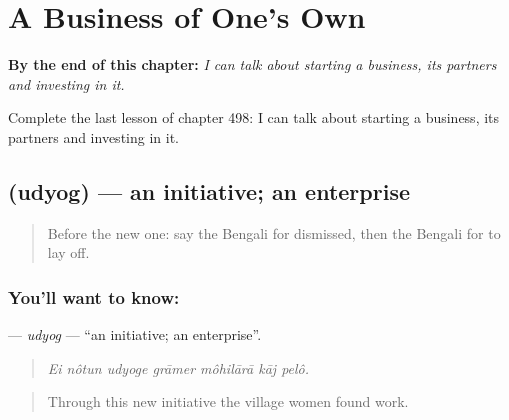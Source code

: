 
\chapter{A Business of One's Own}
\label{ch:bn-a-business-of-one-s-own}

\begin{chapteropening}
\textbf{By the end of this chapter:} \emph{I can talk about starting a business, its partners and investing in it.}

Complete the last lesson of chapter 498: I can talk about starting a business, its partners and investing in it.
\end{chapteropening}

\section[\texorpdfstring{\bn{উদ্যোগ} (udyog)}{উদ্যোগ (udyog)}]{ (udyog) — an initiative; an enterprise}

\label{lesson:BN-C498-udyog}



\begin{quote}
Before the new one: say the Bengali for dismissed, then the Bengali for to lay off.
\end{quote}

\subsection*{You'll want to know: }
\textbf{} — \emph{udyog} — \textquotedblleft{}an initiative; an enterprise\textquotedblright{}.

\begin{quote}
      
\end{quote}

\begin{quote}
\emph{Ei nôtun udyoge grāmer môhilārā kāj pelô.}
\end{quote}

\begin{quote}
Through this new initiative the village women found work.
\end{quote}

